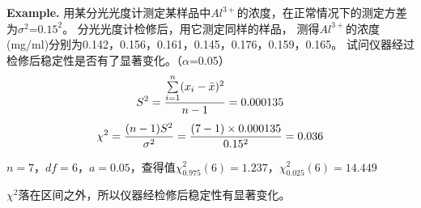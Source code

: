 \documentclass[UTF8]{ctexart}
\begin{document}
\textbf{Example.}
用某分光光度计测定某样品中$Al^{3+}$的浓度，在正常情况下的测定方差为$\sigma^2$=$0.15^2$。
分光光度计检修后，用它测定同样的样品，
测得$Al^{3+}$的浓度(mg/ml)分别为0.142，0.156，0.161，0.145，0.176，0.159，0.165。
试问仪器经过检修后稳定性是否有了显著变化。（$\alpha $=0.05）
\begin{equation}\notag
  S^{2}=\frac{\sum\limits_{i=1}^n(x_{i}-\bar{x})^2}{n-1}=0.000135
\end{equation}
\begin{equation}\notag
 \chi^{2}=\frac{(n-1)S^{2}}{\sigma^2}=\frac{(7-1)\times 0.000135}{0.15^2}=0.036
\end{equation}
\par $n=7$，$df=6$，$a=0.05$，查得值$\chi^{2}_{0.975}(6)=1.237$，$\chi^{2}_{0.025}(6)=14.449$
\par $\chi^{2}$落在区间之外，所以仪器经检修后稳定性有显著变化。
\end{document}
